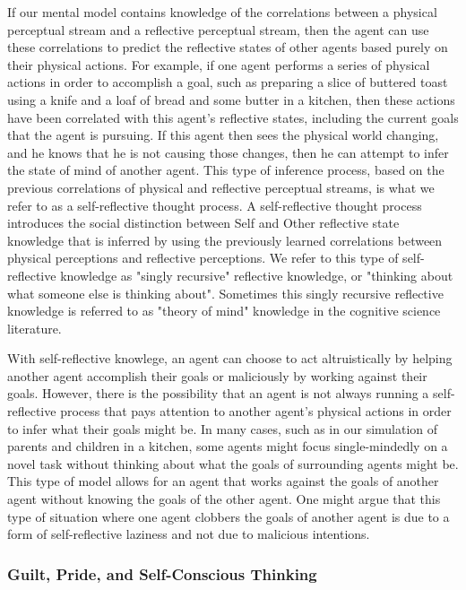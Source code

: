If our mental model contains knowledge of the correlations between a
physical perceptual stream and a reflective perceptual stream, then
the agent can use these correlations to predict the reflective states
of other agents based purely on their physical actions. For example,
if one agent performs a series of physical actions in order to
accomplish a goal, such as preparing a slice of buttered toast using a
knife and a loaf of bread and some butter in a kitchen, then these
actions have been correlated with this agent's reflective states,
including the current goals that the agent is pursuing. If this agent
then sees the physical world changing, and he knows that he is not
causing those changes, then he can attempt to infer the state of mind
of another agent. This type of inference process, based on the
previous correlations of physical and reflective perceptual streams,
is what we refer to as a self-reflective thought process. A
self-reflective thought process introduces the social distinction
between Self and Other reflective state knowledge that is inferred by
using the previously learned correlations between physical perceptions
and reflective perceptions. We refer to this type of self-reflective
knowledge as "singly recursive" reflective knowledge, or "thinking
about what someone else is thinking about". Sometimes this singly
recursive reflective knowledge is referred to as "theory of mind"
knowledge in the cognitive science literature.

With self-reflective knowlege, an agent can choose to act
altruistically by helping another agent accomplish their goals or
maliciously by working against their goals. However, there is the
possibility that an agent is not always running a self-reflective
process that pays attention to another agent's physical actions in
order to infer what their goals might be. In many cases, such as in
our simulation of parents and children in a kitchen, some agents might
focus single-mindedly on a novel task without thinking about what the
goals of surrounding agents might be. This type of model allows for an
agent that works against the goals of another agent without knowing
the goals of the other agent. One might argue that this type of
situation where one agent clobbers the goals of another agent is due
to a form of self-reflective laziness and not due to malicious
intentions.

\subsubsection{Guilt, Pride, and Self-Conscious Thinking}

